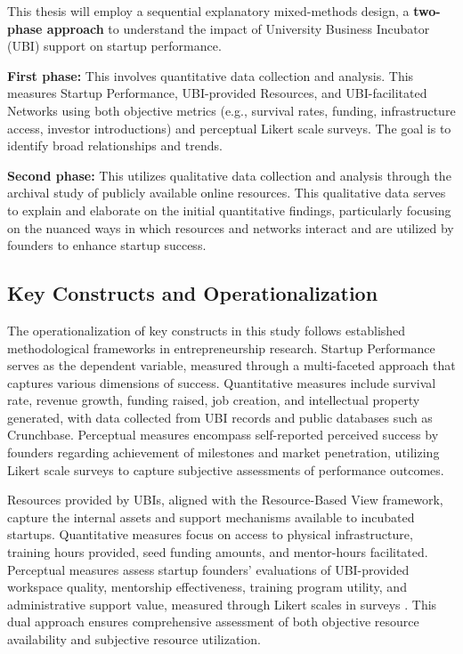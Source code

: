 \documentclass[../Main.tex]{subfiles}
\begin{document}
    \begin{condensed_idea}
        This thesis will employ a sequential explanatory mixed-methods design, a \textbf{two-phase approach} to understand the impact of University Business Incubator (UBI) support on startup performance.
    
        \textbf{First phase:} This involves quantitative data collection and analysis. This measures Startup Performance, UBI-provided Resources, and UBI-facilitated Networks using both objective metrics (e.g., survival rates, funding, infrastructure access, investor introductions) and perceptual Likert scale surveys. The goal is to identify broad relationships and trends.
    
        \textbf{Second phase:} This utilizes qualitative data collection and analysis through the archival study of publicly available online resources. This qualitative data serves to explain and elaborate on the initial quantitative findings, particularly focusing on the nuanced ways in which resources and networks interact and are utilized by founders to enhance startup success.
    \end{condensed_idea}

    \subsection{Key Constructs and Operationalization}
    The operationalization of key constructs in this study follows established methodological frameworks in entrepreneurship research. Startup Performance serves as the dependent variable, measured through a multi-faceted approach that captures various dimensions of success. Quantitative measures include survival rate, revenue growth, funding raised, job creation, and intellectual property generated, with data collected from UBI records and public databases such as Crunchbase. Perceptual measures encompass self-reported perceived success by founders regarding achievement of milestones and market penetration, utilizing Likert scale surveys to capture subjective assessments of performance outcomes.

    Resources provided by UBIs, aligned with the Resource-Based View framework, capture the internal assets and support mechanisms available to incubated startups. Quantitative measures focus on access to physical infrastructure, training hours provided, seed funding amounts, and mentor-hours facilitated. Perceptual measures assess startup founders' evaluations of UBI-provided workspace quality, mentorship effectiveness, training program utility, and administrative support value, measured through Likert scales in surveys \autocite{mian1996assessing}. This dual approach ensures comprehensive assessment of both objective resource availability and subjective resource utilization.
\end{document}
